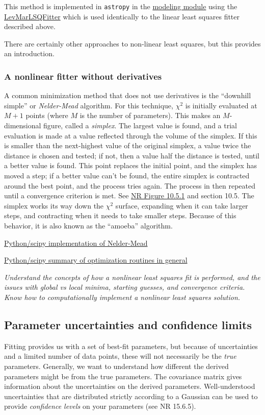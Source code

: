 \documentclass{article}
\newcommand{\test}[1]{%
    \begin{center}
        \colorbox{hl}{\parbox{0.9\textwidth}{\emph{\centering #1}}}
    \end{center}}
\begin{document}
This method is implemented in \texttt{astropy} in the
\href{http://astropy.readthedocs.org/en/v1.0.6/modeling/index.html}
{modeling module} using the
\href{http://docs.astropy.org/en/stable/api/astropy.modeling.fitting.LevMarLSQFitter.html}
{LevMarLSQFitter} which is used identically to the linear least squares
fitter described above.

There are certainly other approaches to non-linear least squares, but
this provides an introduction.

\subsubsection{A nonlinear fitter without derivatives}
A common minimization method that does not use derivatives is the ``downhill
simple'' or \textit{Nelder-Mead} algorithm. For this technique, $\chi^{2}$ is
initially evaluated at $M+1$ points (where $M$ is the number of parameters).
This makes an $M$-dimensional figure, called a \textit{simplex}. The largest
value is found, and a trial evaluation is made at a value reflected through the
volume of the simplex. If this is smaller than the next-highest value of the
original simplex, a value twice the distance is chosen and tested; if not, then
a value half the distance is tested, until a better value is found. This point
replaces the initial point, and the simplex has moved a step; if a better value
can't be found, the entire simplex is contracted around the best point, and the
process tries again. The process in then repeated until a convergence criterion
is met. See
\href{}
{NR Figure 10.5.1} and section 10.5.
The simplex works its way down the $ \chi^{2}$ surface, expanding
when it can take larger steps, and contracting when it needs to take
smaller steps. Because of this behavior, it is also known as the
``amoeba'' algorithm.

\href{http://docs.scipy.org/doc/scipy-0.16.0/reference/generated/scipy.optimize.fmin.html}
{Python/scipy implementation of Nelder-Mead}

\href{https://docs.scipy.org/doc/scipy-0.16.1/reference/tutorial/optimize.html}
{Python/scipy summary of optimization routines in general}

\test{Understand the concepts of how a nonlinear least squares fit is
performed, and the issues with global vs local minima,
starting guesses, and convergence criteria. Know how to
computationally implement a nonlinear least squares solution.}

\subsection{Parameter uncertainties and confidence limits}
Fitting provides us with a set of best-fit parameters, but because of
uncertainties and a limited number of data points, these will not necessarily
be the \emph{true} parameters. Generally, we want to understand how different
the derived parameters might be from the true parameters. The covariance matrix
gives information about the uncertainties on the derived parameters.
Well-understood uncertainties that are distributed strictly according to a
Gaussian can be used to provide \textit{confidence levels} on your parameters
(see NR 15.6.5).
\end{document}
